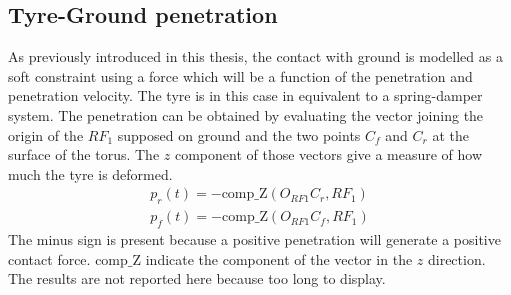 \subsection{Tyre-Ground penetration}
%
As previously introduced in this thesis, the contact with ground is modelled as a soft constraint using a force which will be a function of the penetration and penetration velocity. The tyre is in this case in equivalent to a spring-damper system.\cite{sharp2004advances,leonelli2019optimal}
The penetration can be obtained by evaluating the vector joining the origin of the $RF_1$ supposed on ground and the two points $C_f$ and $C_r$ at the surface of the torus. The $z$ component of those vectors give a measure of how much the tyre is deformed.
%
\begin{equation}
    \begin{array}{l}
        p_r(t) = - \mathrm{comp\_Z}(O_{RF1}C_r,RF_1)\\
        p_f(t) = - \mathrm{comp\_Z}(O_{RF1}C_f,RF_1)
    \end{array}
\end{equation}
%
The minus sign is present because a positive penetration will generate a positive contact force.
$\mathrm{comp\_Z}$ indicate the component of the vector in the $z$ direction.
The results are not reported here because too long to display.
%
